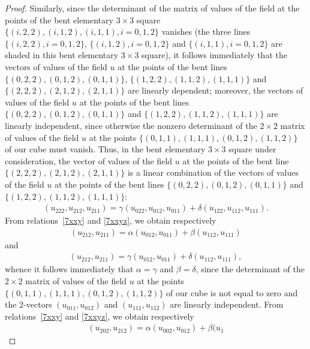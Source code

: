 \begin{proof}
Similarly, since the determinant of the matrix of values of the
f\/ield at the points of the bent ele\-mentary $3 \times 3$ square
$\{(i, 2, 2), (i, 1, 2), (i, 1, 1), i = 0, 1, 2\}$ vanishes (the
three lines $\{(i, 2, 2), i = 0, 1, 2\}$, $\{(i, 1, 2), i = 0, 1,
2\}$ and $\{(i, 1, 1), i = 0, 1, 2\}$ are shaded in this bent
elementary $3 \times 3$ square), it follows immediately that the
vectors of values of the f\/ield $u$ at the points of the bent lines
$\{(0, 2, 2), (0, 1, 2), (0, 1, 1)\}$, $\{(1, 2, 2), (1, 1, 2), (1,
1, 1)\}$ and $\{(2, 2, 2), (2, 1, 2), (2, 1, 1)\}$ are linearly
dependent; moreover, the vectors of values of the f\/ield $u$ at the
points of the bent lines $\{(0, 2, 2), (0, 1, 2), (0, 1, 1)\}$ and
$\{(1, 2, 2), (1, 1, 2), (1, 1, 1)\}$ are linearly independent,
since otherwise the nonzero determinant of the $2 \times 2$ matrix
of values of the f\/ield $u$ at the points $\{(0, 1, 1), (1, 1, 1),
(0, 1, 2), (1, 1, 2)\}$ of our cube must vanish. Thus, in the bent
elementary $3 \times 3$ square under consideration, the vector of
values of the f\/ield $u$ at the points of the bent line $\{(2, 2, 2),
(2, 1, 2), (2, 1, 1)\}$ is a linear combination of the vectors of
values of the f\/ield $u$ at the points of the bent lines $\{(0, 2,
2), (0, 1, 2), (0, 1, 1)\}$ and $\{(1, 2, 2), (1, 1, 2), (1, 1,
1)\}$:
\begin{gather}
(u_{2 2 2}, u_{2 1 2}, u_{2 1 1}) = \gamma (u_{0 2 2},
u_{0 1 2}, u_{0 1 1}) + \delta (u_{1 2 2}, u_{1 1 2}, u_{1 1 1}).
\label{7xxyz}
\end{gather} From relations~\eqref{7xxy} and \eqref{7xxyz}, we
obtain respectively
\begin{gather*} (u_{2 1 2}, u_{2 1 1}) = \alpha (u_{0 1 2},
u_{0 1 1}) + \beta (u_{1 1 2}, u_{1 1 1}) %
\end{gather*} and
\begin{gather*}
(u_{2 1 2}, u_{2 1 1}) = \gamma (u_{0 1 2}, u_{0 1 1}) + \delta
(u_{1 1 2}, u_{1 1 1}), %
\end{gather*} whence it follows
immediately that $\alpha = \gamma$ and $\beta = \delta$, since the
determinant of the $2 \times 2$ matrix of values of the f\/ield $u$ at
the points $\{(0, 1, 1), (1, 1, 1), (0, 1, 2), (1, 1, 2)\}$ of our
cube is not equal to zero and the $2$-vectors $(u_{0 1 1}, u_{0 1
2})$ and $(u_{1 1 1}, u_{1 1 2})$ are linearly independent. From
relations~\eqref{7xxy} and \eqref{7xxyz}, we obtain respectively \begin{gather}
(u_{2 0 2}, u_{2 1 2}) = \alpha (u_{0 0 2}, u_{0 1 2}) + \beta (u_{1
}
\end{gather}
\end{proof}
